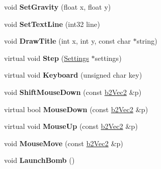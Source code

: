 \begin{DoxyCompactItemize}
\item 
\hypertarget{class_test_ad26fc4696a4a8082f0650030177d3775}{void {\bfseries Set\-Gravity} (float x, float y)}\label{class_test_ad26fc4696a4a8082f0650030177d3775}

\item 
\hypertarget{class_test_a4c38c7fd062f199b99155f02072f6576}{void {\bfseries Set\-Text\-Line} (int32 line)}\label{class_test_a4c38c7fd062f199b99155f02072f6576}

\item 
\hypertarget{class_test_a0d270929c447dfc57be6db7186628b70}{void {\bfseries Draw\-Title} (int x, int y, const char $\ast$string)}\label{class_test_a0d270929c447dfc57be6db7186628b70}

\item 
\hypertarget{class_test_a9158d70ad7d77ca86937debb54c3e959}{virtual void {\bfseries Step} (\hyperlink{struct_settings}{Settings} $\ast$settings)}\label{class_test_a9158d70ad7d77ca86937debb54c3e959}

\item 
\hypertarget{class_test_a794e4d4a30c1e7f13b62eb775e59c012}{virtual void {\bfseries Keyboard} (unsigned char key)}\label{class_test_a794e4d4a30c1e7f13b62eb775e59c012}

\item 
\hypertarget{class_test_aefa1d0ec080ed52b0a6b37664b6f75cd}{void {\bfseries Shift\-Mouse\-Down} (const \hyperlink{structb2_vec2}{b2\-Vec2} \&p)}\label{class_test_aefa1d0ec080ed52b0a6b37664b6f75cd}

\item 
\hypertarget{class_test_a99368dbe1198822b4d7141117b28841a}{virtual bool {\bfseries Mouse\-Down} (const \hyperlink{structb2_vec2}{b2\-Vec2} \&p)}\label{class_test_a99368dbe1198822b4d7141117b28841a}

\item 
\hypertarget{class_test_abb875f0e7d3f8d090738a8455a7dacfd}{virtual void {\bfseries Mouse\-Up} (const \hyperlink{structb2_vec2}{b2\-Vec2} \&p)}\label{class_test_abb875f0e7d3f8d090738a8455a7dacfd}

\item 
\hypertarget{class_test_a043a2d8dea5248b839c501e03df97475}{void {\bfseries Mouse\-Move} (const \hyperlink{structb2_vec2}{b2\-Vec2} \&p)}\label{class_test_a043a2d8dea5248b839c501e03df97475}

\item 
\hypertarget{class_test_a3f004c3be556e7765e39c59ba1561441}{void {\bfseries Launch\-Bomb} ()}\label{class_test_a3f004c3be556e7765e39c59ba1561441}


\end{DoxyCompactItemize}
